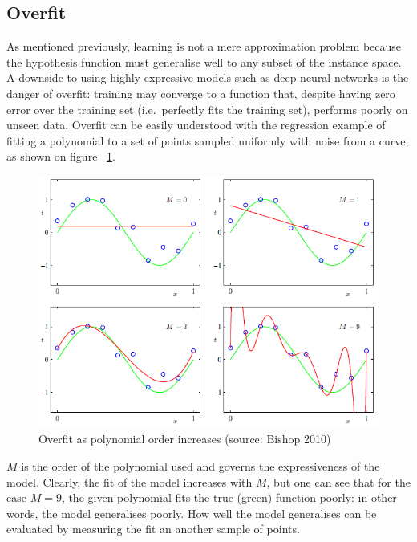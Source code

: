 \documentclass[a4paper,11pt]{article}
\begin{document}

\subsection{Overfit}

As mentioned previously, learning is not a mere approximation problem because the hypothesis function must generalise well to any subset of the instance space. A downside to using highly expressive models such as deep neural networks is the danger of overfit: training may converge to a function that, despite having zero error over the training set (i.e.\ perfectly fits the training set), performs poorly on unseen data. Overfit can be easily understood with the regression example of fitting a polynomial to a set of points sampled uniformly with noise from a curve, as shown on figure ~\ref{f15}. 

\begin{figure}[h!]
	\centering
	\includegraphics[scale=0.8]{images/overfit.png}
	\caption{Overfit as polynomial order increases (source: Bishop 2010)}
    \label{f15}
\end{figure}

$M$ is the order of the polynomial used and governs the expressiveness of the model. Clearly, the fit of the model increases with $M$, but one can see that for the case $M = 9$, the given polynomial fits the true (green) function poorly: in other words, the model generalises poorly. How well the model generalises can be evaluated by measuring the fit an another sample of points. \\
\end{document}
